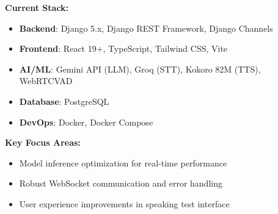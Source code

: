 \documentclass[11pt]{article}
\begin{document}
\textbf{Current Stack:}
\begin{itemize}[leftmargin=2em]
    \item \textbf{Backend}: Django 5.x, Django REST Framework, Django Channels
    \item \textbf{Frontend}: React 19+, TypeScript, Tailwind CSS, Vite
    \item \textbf{AI/ML}: Gemini API (LLM), Groq (STT), Kokoro 82M (TTS), WebRTCVAD
    \item \textbf{Database}: PostgreSQL
    \item \textbf{DevOps}: Docker, Docker Compose
\end{itemize}

\textbf{Key Focus Areas:}
\begin{itemize}[leftmargin=2em]
    \item Model inference optimization for real-time performance
    \item Robust WebSocket communication and error handling
    \item User experience improvements in speaking test interface
\end{itemize}
\end{document}
